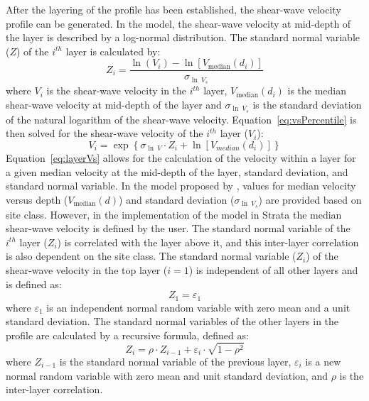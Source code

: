 \documentclass[12pt,oneside]{book}
\begin{document}
After the layering of the profile has been established, the shear-wave velocity profile can be
generated.  In the \citet{toro:95} model, the shear-wave velocity at mid-depth of the layer is
described by a log-normal distribution.  The standard normal variable ($Z$) of the $i^{th}$ layer is
calculated by:
\begin{equation}
    Z_i = \frac{\ln(V_i) - \ln[ V_\text{median}(d_i)]}{\sigma_{\ln\ V_s}}
    \label{eq:vsPercentile}
\end{equation}
where $V_i$ is the shear-wave velocity in the $i^{th}$ layer, $V_\text{median}(d_i)$ is the median
shear-wave velocity at mid-depth of the layer and $\sigma_{\ln\ V_s}$ is the standard deviation of the
natural logarithm of the shear-wave velocity.  Equation~\ref{eq:vsPercentile} is then solved for the
shear-wave velocity of the $i^{th}$ layer ($V_i$):
\begin{equation}
    V_i = \exp \left\{ \sigma_{\ln\ V} \cdot Z_i + \ln \left[ V_{median}(d_i) \right] \right\}
    \label{eq:layerVs}
\end{equation}
Equation~\ref{eq:layerVs} allows for the calculation of the velocity within a layer for a given
median velocity at the mid-depth of the layer, standard deviation, and standard normal variable.  In
the model proposed by \citet{toro:95}, values for median velocity versus depth ($V_\text{median}(d)$) and
standard deviation ($\sigma_{\ln\ V_s}$) are provided based on site class. However, in the
implementation of the \citet{toro:95} model in Strata the median shear-wave velocity is defined by
the user.  The standard normal variable of the $i^{th}$ layer ($Z_i$) is correlated with the layer
above it, and this inter-layer correlation is also dependent on the site class.  The standard normal
variable ($Z_i$) of the shear-wave velocity in the top layer ($i=1$) is independent of all other
layers and is defined as:
\begin{equation}
    Z_1 = \varepsilon_1
\end{equation}
where $\varepsilon_1$ is an independent normal random variable with zero mean and a unit standard
deviation.  The standard normal variables of the other layers in the profile are calculated by a
recursive formula, defined as:
\begin{equation}
    Z_i = \rho \cdot Z_{i-1} + \varepsilon_i \cdot \sqrt{1 - \rho^2}
\end{equation}
where $Z_{i-1}$ is the standard normal variable of the previous layer, $\varepsilon_i$ is a new
normal random variable with zero mean and unit standard deviation, and $\rho$ is the inter-layer
correlation.
\end{document}
